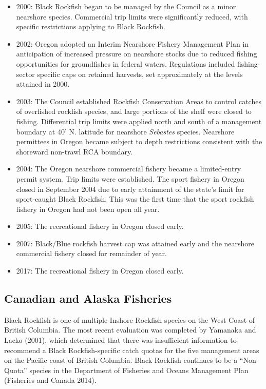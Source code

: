 \documentclass[11pt,
  letterpaper,
]{article}
\providecommand{\tightlist}{%
  \setlength{\itemsep}{0pt}\setlength{\parskip}{0pt}}
\providecommand{\tightlist}{%
  \setlength{\itemsep}{0pt}\setlength{\parskip}{0pt}}
\begin{document}
\begin{itemize}
\tightlist
\item
  2000: Black Rockfish began to be managed by the Council as a minor nearshore species. Commercial trip limits were significantly reduced, with specific restrictions applying to Black Rockfish.
\item
  2002: Oregon adopted an Interim Nearshore Fishery Management Plan in anticipation of increased pressure on nearshore stocks due to reduced fishing opportunities for groundfishes in federal waters. Regulations included fishing-sector specific caps on retained harvests, set approximately at the levels attained in 2000.
\item
  2003: The Council established Rockfish Conservation Areas to control catches of overfished rockfish species, and large portions of the shelf were closed to fishing. Differential trip limits were applied north and south of a management boundary at 40' N. latitude for nearshore \emph{Sebastes} species. Nearshore permittees in Oregon became subject to depth restrictions consistent with the shoreward non-trawl RCA boundary.
\item
  2004: The Oregon nearshore commercial fishery became a limited-entry permit system. Trip limits were established. The sport fishery in Oregon closed in September 2004 due to early attainment of the state's limit for sport-caught Black Rockfish. This was the first time that the sport rockfish fishery in Oregon had not been open all year.
\item
  2005: The recreational fishery in Oregon closed early.
\item
  2007: Black/Blue rockfish harvest cap was attained early and the nearshore commercial fishery closed for remainder of year.
\item
  2017: The recreational fishery in Oregon closed early.
\end{itemize}

\hypertarget{canadian-and-alaska-fisheries}{%
\subsection{Canadian and Alaska Fisheries}\label{canadian-and-alaska-fisheries}}

Black Rockfish is one of multiple Inshore Rockfish species on the West Coast of British Columbia. The most recent evaluation was completed by Yamanaka and Lacko (2001), which determined that there was insufficient information to recommend a Black Rockfish-specific catch quotas for the five management areas on the Pacific coast of British Columbia. Black Rockfish continues to be a ``Non-Quota'' species in the Department of Fisheries and Oceans Management Plan (Fisheries and Canada 2014).
\end{document}
